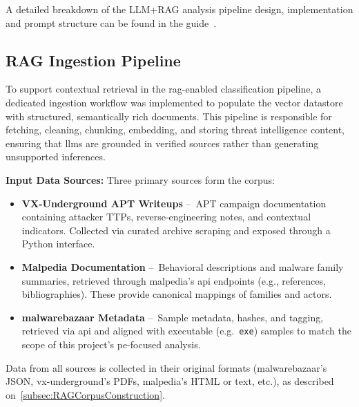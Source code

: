 \vspace{0.5em}
\noindent A detailed breakdown of the LLM+RAG analysis pipeline design, implementation and
prompt structure can be found in the guide~\cite{rexisLLMRagPipeline}.

\subsection{RAG Ingestion Pipeline}\label{subsec:RAGIngestionPipeline}
To support contextual retrieval in the \gls{rag}-enabled classification pipeline, a dedicated
ingestion workflow was implemented to populate the vector datastore with structured, semantically
rich documents. This pipeline is responsible for fetching, cleaning, chunking, embedding, and
storing threat intelligence content, ensuring that \glspl{llm} are grounded in verified sources
rather than generating unsupported inferences.

\vspace{0.5em}
\noindent\textbf{Input Data Sources:} Three primary sources form the corpus:
\begin{itemize}
      \item \textbf{VX-Underground APT Writeups} --~APT campaign documentation containing
            attacker TTPs, reverse-engineering notes, and contextual indicators. Collected
            via curated archive scraping and exposed through a Python interface.
      \item \textbf{Malpedia Documentation} --~Behavioral descriptions and malware family
            summaries, retrieved through \gls{malpedia}’s \gls{api} endpoints (e.g., references,
            bibliographies). These provide canonical mappings of families and actors.
      \item \textbf{\gls{malwarebazaar} Metadata} --~Sample metadata, hashes, and tagging, retrieved
            via \gls{api} and aligned with executable (e.g.\ \texttt{exe}) samples to match the scope of
            this project’s \gls{pe}-focused analysis.
\end{itemize}
Data from all sources is collected in their original formats (\gls{malwarebazaar}'s
JSON, \gls{vx-underground}'s PDFs, \gls{malpedia}'s HTML or text, etc.), as described on~\ref{subsec:RAGCorpusConstruction}.

